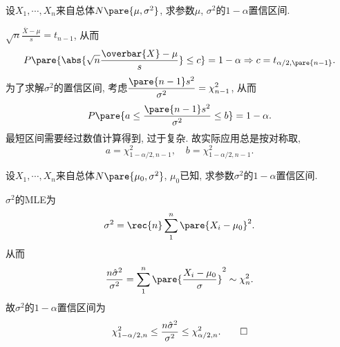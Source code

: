 \documentclass{ctexart}
\begin{document}
\begin{sample}
    \begin{ex}
        设$X_1,\cdots,X_n$来自总体$N\pare{\mu,\sigma^2}$, 求参数$\mu$, $\sigma^2$的$1-\alpha$置信区间.
    \end{ex}
    \begin{solution}
        $\displaystyle \sqrt{n} \frac{\overbar{X} - \mu}{s} = t_{n-1}$, 从而
        \[ P\pare{\abs{\sqrt{n} \frac{\overbar{X} - \mu}{s}} \le c} = 1-\alpha \Rightarrow c = t_{\alpha/2,\pare{n-1}}. \]
        为了求解$\sigma^2$的置信区间, 考虑$\displaystyle \frac{\pare{n-1}s^2}{\sigma^2} = \chi_{n-1}^2$, 从而
        \[ P\pare{a\le \frac{\pare{n-1}s^2}{\sigma^2} \le b} = 1-\alpha. \]
        最短区间需要经过数值计算得到, 过于复杂. 故实际应用总是按对称取,
        \[ a = \chi^2_{1-\alpha/2, n-1},\quad b = \chi^2_{1-\alpha/2,n-1}. \]
    \end{solution}
\end{sample}
\begin{sample}
    \begin{ex}
        设$X_1,\cdots,X_n$来自总体$N\pare{\mu_0,\sigma^2}$, $\mu_0$已知, 求参数$\sigma^2$的$1-\alpha$置信区间.
    \end{ex}
    \begin{solution}
        $\sigma^2$的MLE为
        \[ \sigma^2 = \rec{n} \sum_{1}^n \pare{X_i - \mu_0}^2. \]
        从而
        \[ \frac{n\hat\sigma^2}{\sigma^2} = \sum_1^n \pare{\frac{X_i-\mu_0}{\sigma}}^2 \sim \chi_n^2. \]
        故$\sigma^2$的$1-\alpha$置信区间为
        \[ \chi_{1-\alpha/2,n}^2 \le \frac{n\hat\sigma^2}{\sigma^2} \le \chi_{\alpha/2,n}^2. \qedhere \]
    \end{solution}
\end{sample}
\end{document}
